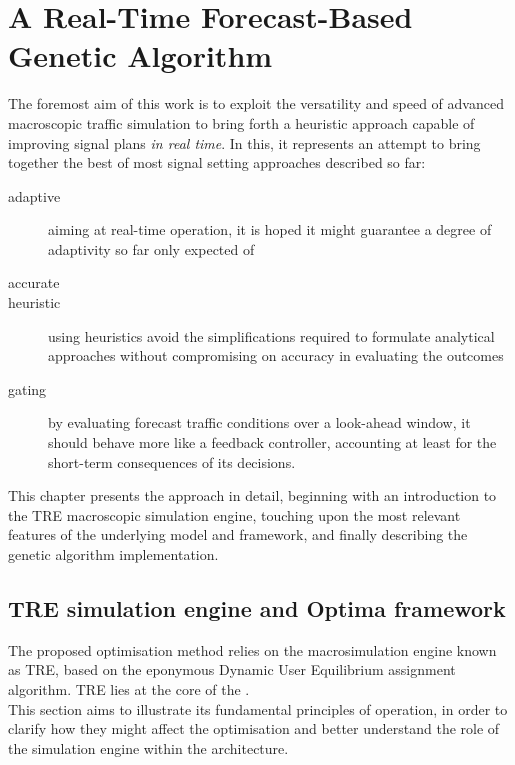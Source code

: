 \chapter{A Real-Time Forecast-Based Genetic Algorithm}

The foremost aim of this work is to exploit the versatility and speed of advanced macroscopic traffic simulation to bring forth a heuristic approach capable of improving signal plans \emph{in real time}.
In this, it represents an attempt to bring together the best of most signal setting approaches described so far:
\begin{description}
\item[adaptive] aiming at real-time operation, it is hoped it might guarantee a degree of adaptivity so far only expected of 
\item[accurate] 
\item[heuristic] using heuristics avoid the simplifications required to formulate analytical approaches without compromising on accuracy in evaluating the outcomes
\item[gating] by evaluating forecast traffic conditions over a look-ahead window, it should behave more like a feedback controller, accounting at least for the short-term consequences of its decisions.
\end{description}

This chapter presents the approach in detail, beginning with an introduction to the TRE macroscopic simulation engine, touching upon the most relevant features of the underlying model and framework, and finally describing the genetic algorithm implementation.




\section{TRE simulation engine and Optima framework}
The proposed optimisation method relies on the macrosimulation engine known as TRE, based on the eponymous Dynamic User Equilibrium assignment algorithm.
TRE lies at the core of the .\\
This section aims to illustrate its fundamental principles of operation, in order to clarify how they might affect the optimisation and better understand the role of the simulation engine within the architecture.

